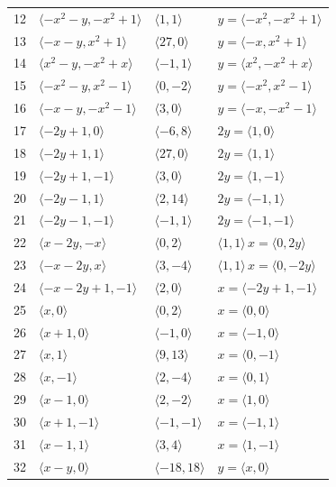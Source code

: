 \documentclass[11pt]{article}
\begin{document}
\begin{longtable}{@{}rlll@{}}
12 & $\langle -x^{2}-y,-x^{2}+1\rangle$ & $\langle 1,1\rangle$ & $y=\langle -x^{2},-x^{2}+1\rangle$\\
13 & $\langle -x-y,x^{2}+1\rangle$ & $\langle 27,0\rangle$ & $y=\langle -x,x^{2}+1\rangle$\\
14 & $\langle x^{2}-y,-x^{2}+x\rangle$ & $\langle -1,1\rangle$ & $y=\langle x^{2},-x^{2}+x\rangle$\\
15 & $\langle -x^{2}-y,x^{2}-1\rangle$ & $\langle 0,-2\rangle$ & $y=\langle -x^{2},x^{2}-1\rangle$\\
16 & $\langle -x-y,-x^{2}-1\rangle$ & $\langle 3,0\rangle$ & $y=\langle -x,-x^{2}-1\rangle$\\
17 & $\langle -2y+1,0\rangle$ & $\langle -6,8\rangle$ & $2y=\langle 1,0\rangle$\\
18 & $\langle -2y+1,1\rangle$ & $\langle 27,0\rangle$ & $2y=\langle 1,1\rangle$\\
19 & $\langle -2y+1,-1\rangle$ & $\langle 3,0\rangle$ & $2y=\langle 1,-1\rangle$\\
20 & $\langle -2y-1,1\rangle$ & $\langle 2,14\rangle$ & $2y=\langle -1,1\rangle$\\
21 & $\langle -2y-1,-1\rangle$ & $\langle -1,1\rangle$ & $2y=\langle -1,-1\rangle$\\
22 & $\langle x-2y,-x\rangle$ & $\langle 0,2\rangle$ & $\langle 1,1\rangle\,x=\langle 0,2y\rangle$\\
23 & $\langle -x-2y,x\rangle$ & $\langle 3,-4\rangle$ & $\langle 1,1\rangle\,x=\langle 0,-2y\rangle$\\
24 & $\langle -x-2y+1,-1\rangle$ & $\langle 2,0\rangle$ & $x=\langle -2y+1,-1\rangle$\\
25 & $\langle x,0\rangle$ & $\langle 0,2\rangle$ & $x=\langle 0,0\rangle$\\
26 & $\langle x+1,0\rangle$ & $\langle -1,0\rangle$ & $x=\langle -1,0\rangle$\\
27 & $\langle x,1\rangle$ & $\langle 9,13\rangle$ & $x=\langle 0,-1\rangle$\\
28 & $\langle x,-1\rangle$ & $\langle 2,-4\rangle$ & $x=\langle 0,1\rangle$\\
29 & $\langle x-1,0\rangle$ & $\langle 2,-2\rangle$ & $x=\langle 1,0\rangle$\\
30 & $\langle x+1,-1\rangle$ & $\langle -1,-1\rangle$ & $x=\langle -1,1\rangle$\\
31 & $\langle x-1,1\rangle$ & $\langle 3,4\rangle$ & $x=\langle 1,-1\rangle$\\
32 & $\langle x-y,0\rangle$ & $\langle -18,18\rangle$ & $y=\langle x,0\rangle$\\

\end{longtable}
\end{document}
